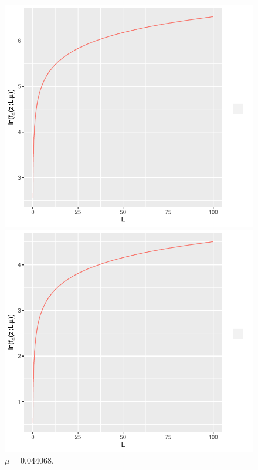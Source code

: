 \documentclass[journal,article,submit,moreauthors,pdftex]{Definitions/mdpi}
\begin{document}
\begin{figure}[hbt]
		\caption{ $\mu=0.003186 $.}\label{func_max_ver_l_z_fixo_mu_21_fixo}
\endminipage\hfill
\centering
\vspace{0.5cm}
  \includegraphics[width=\linewidth]{func_max_ver_sigma_31_flev_wishart.pdf}
  	\caption{$\mu=0.00582$.}\label{func_max_ver_l_z_fixo_mu_31_fixo}
\endminipage\hfill
{}
  \includegraphics[width=\linewidth]{func_max_ver_sigma_41_flev_wishart.pdf}
		\caption{$\mu=0.044068 $.}\label{func_max_ver_l_z_fixo_mu_41_fixo}
\endminipage\hfill
\end{figure}\
\end{document}
